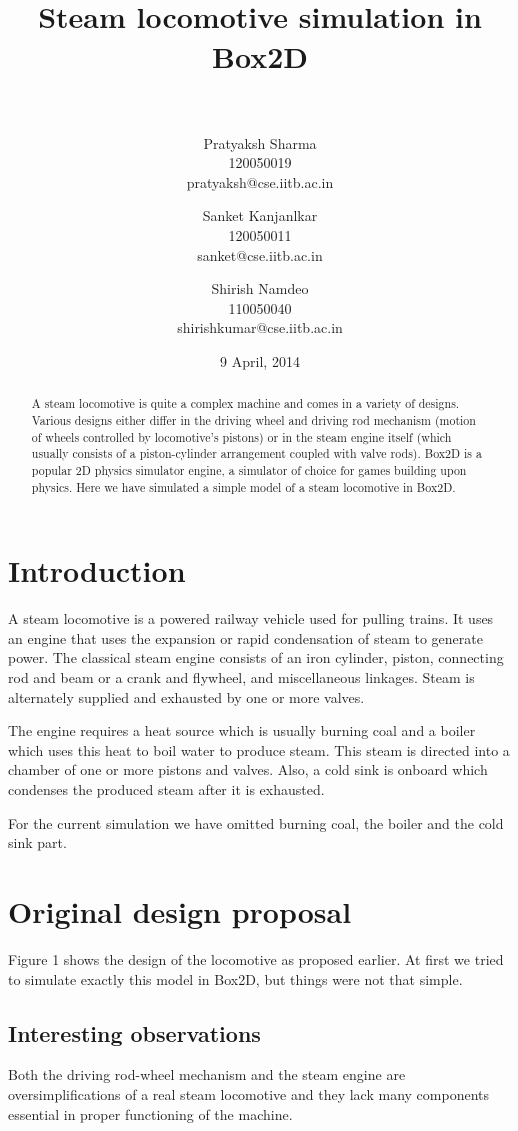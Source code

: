 \documentclass[pdftex,12pt,a4paper]{article}
\author{
  Pratyaksh Sharma\\
  120050019\\
  pratyaksh@cse.iitb.ac.in
  \and
  Sanket Kanjanlkar\\
  120050011\\
  sanket@cse.iitb.ac.in
  \and 
  Shirish Namdeo\\
  110050040\\
  shirishkumar@cse.iitb.ac.in
}
\title{\HRule \\[0.4cm]{ \huge \bfseries Steam locomotive simulation in Box2D \\[0.4cm] }\HRule \\[1.5cm]}
\date{9 April, 2014}
\begin{document}
\maketitle
\begin{abstract}
\indent \par{A steam locomotive is quite a complex machine and comes in a variety of designs. Various designs either differ in the driving wheel and driving rod mechanism (motion of wheels controlled by locomotive's pistons) or in the steam engine itself (which usually consists of a piston-cylinder arrangement coupled with valve rods). Box2D is a popular 2D physics simulator engine, a simulator of choice for games building upon physics. Here we have simulated a simple model of a steam locomotive in Box2D.}
\end{abstract}

\tableofcontents

\pagebreak

\section{Introduction}
\par{A steam locomotive is a powered railway vehicle used for pulling trains. It uses an engine that uses the expansion or rapid condensation of steam to generate power. The classical steam engine consists of an iron cylinder, piston, connecting rod and beam or a crank and flywheel, and miscellaneous linkages. Steam is alternately supplied and exhausted by one or more valves.}
\par{The engine requires a heat source which is usually burning coal and a boiler which uses this heat to boil water to produce steam. This steam is directed into a chamber of one or more pistons and valves. Also, a cold sink is onboard which condenses the produced steam after it is exhausted.}
\par{For the current simulation we have omitted burning coal, the boiler and the cold sink part.}

\section{Original design proposal}
\par{Figure 1 shows the design of the locomotive as proposed earlier\cite{youtube1}. At first we tried to simulate exactly this model in Box2D, but things were not that simple.}

\subsection{Interesting observations}
\par{Both the driving rod-wheel mechanism and the steam engine are oversimplifications of a real steam locomotive and they lack many components essential in proper functioning of the machine.}
\end{document}
